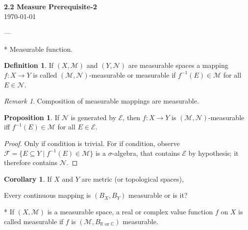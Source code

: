 \documentclass[11pt]{article}
\theoremstyle{definition}
\newtheorem{definition}{Definition}[section]
\newtheorem{proposition}{Proposition}[section]
\newtheorem{corollary}{Corollary}[section]
\theoremstyle{remark}
\newtheorem{remark}{Remark}[section]
\begin{document}
\begin{center}
{\Large\textbf{2.2 Measure Prerequisite-2}}\\
\vspace{0.3cm}
{\normalsize\today}
\end{center}
\vspace{0.5cm}


---

* Measurable function.

\begin{definition}
\label{def:measurable_function}
If $(X, \mathcal{M})$ and $(Y, \mathcal{N})$ are measurable spaces a mapping $f: X \rightarrow Y$ is called $(\mathcal{M}, \mathcal{N})$-measurable or measurable if $f^{-1}(E) \in \mathcal{M}$ for all $E \in \mathcal{N}$.
\end{definition}

\begin{remark}
\label{rem:composition_measurable}
Composition of measurable mappings are measurable.
\end{remark}

\begin{proposition}
\label{prop:generated_sigma_algebra}
If $\mathcal{N}$ is generated by $\mathcal{E}$, then $f: X \rightarrow Y$ is $(\mathcal{M}, \mathcal{N})$-measurable iff $f^{-1}(E) \in \mathcal{M}$ for all $E \in \mathcal{E}$.
\end{proposition}

\begin{proof}
\label{proof:generated_sigma_algebra}
Only if condition is trivial. For if condition, observe $\mathcal{F} = \{E \subseteq Y \mid f^{-1}(E) \in \mathcal{M}\}$ is a $\sigma$-algebra, that contains $\mathcal{E}$ by hypothesis; it therefore contains $\mathcal{N}$.
\end{proof}

\begin{corollary}
\label{cor:metric_topological_spaces}
If $X$ and $Y$ are metric (or topological spaces),
\end{corollary}

Every continuous mapping is \((B_X, B_Y)\) measurable or is it?

* If \((X, \mathcal{M})\) is a measurable space, a real or complex value function \(f\) on \(X\) is called measurable if \(f\) is \((\mathcal{M}, B_{\mathbb{R} \text{ or } \mathbb{C}})\) measurable.
\end{document}
